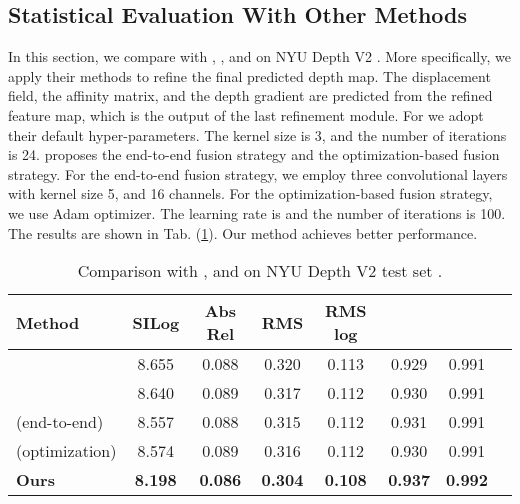 \documentclass{article} \usepackage{iclr2023_conference, times}
\begin{document}
\subsection{Statistical Evaluation With Other Methods}
In this section, we compare with
\citet{ramamonjisoa2020predicting}, \citet{cheng2018depth}, and \citet{li2017two} on NYU Depth V2 \citep{silberman2012indoor}. More specifically, we apply their methods to refine the final predicted depth map. The displacement field, the affinity matrix, and the depth gradient are predicted from the refined feature map, which is the output of the last refinement module. For \citet{cheng2018depth} we adopt their default hyper-parameters. The kernel size is 3, and the number of iterations is 24. \citet{li2017two} proposes the end-to-end fusion strategy and the optimization-based fusion strategy. For the end-to-end fusion strategy, we employ three convolutional layers with kernel size 5, and 16 channels. For the optimization-based fusion strategy, we use Adam optimizer. The learning rate is  and the number of iterations is 100. The results are shown in Tab. (\ref{tab:rebuttal_com}). Our method achieves better performance.

\begin{table}
\begin{center}
\scriptsize
\caption{\small Comparison with \citet{ramamonjisoa2020predicting}, \citet{cheng2018depth} and \citet{li2017two} on NYU Depth V2 test set \citep{silberman2012indoor}. }
\label{tab:rebuttal_com}
\begin{tabular*}{1.0\textwidth}{l@{\extracolsep{\fill}}ccccccc}
\hline
Method & SILog  & Abs Rel & RMS & RMS log &    &  \\
\hline
\citet{ramamonjisoa2020predicting} & 8.655 & 0.088 & 0.320 & 0.113 & 0.929 & 0.991\\
\citet{cheng2018depth} & 8.640 & 0.089 & 0.317 & 0.112 & 0.930 & 0.991\\
\citet{li2017two} (end-to-end) & 8.557 & 0.088 & 0.315 & 0.112 & 0.931 & 0.991\\
\citet{li2017two} (optimization) & 8.574 & 0.089 & 0.316 & 0.112 & 0.930 & 0.991\\
\hline
\textbf{Ours} & \textbf{8.198}  & \textbf{0.086} & \textbf{0.304} &\textbf{0.108} & \textbf{0.937} & \textbf{0.992}\\
\hline
\end{tabular*}
\end{center}
\end{table}
\end{document}
